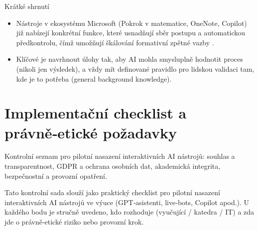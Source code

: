 \documentclass{report}%
\begin{document}
Krátké shrnutí
\begin{itemize}
  \item Nástroje v ekosystému Microsoft (Pokrok v matematice, OneNote, Copilot) již nabízejí konkrétní funkce, které usnadňují sběr postupu a automatickou předkontrolu, čímž umožňují škálování formativní zpětné vazby \cite{kb_ai_101_tipu_pdf_04e4a115_page_8_1, kb_ai_101_tipu_pdf_04e4a115_page_3_1}.
  \item Klíčové je navrhnout úlohy tak, aby AI mohla smysluplně hodnotit proces (nikoli jen výsledek), a vždy mít definované pravidlo pro lidskou validaci tam, kde je to potřeba (general background knowledge).
\end{itemize}%

%
\section{Implementační checklist a právně‑etické požadavky}%
Kontrolní seznam pro pilotní nasazení interaktivních AI nástrojů: souhlas a transparentnost, GDPR a ochrana osobních dat, akademická integrita, bezpečnostní a provozní opatření.%


%
Tato kontrolní sada slouží jako praktický checklist pro pilotní nasazení interaktivních AI nástrojů ve výuce (GPT‑asistenti, live‑bots, Copilot apod.). U každého bodu je stručně uvedeno, kdo rozhoduje (vyučující / katedra / IT) a zda jde o právně‑etické riziko nebo provozní krok.
\end{document}

